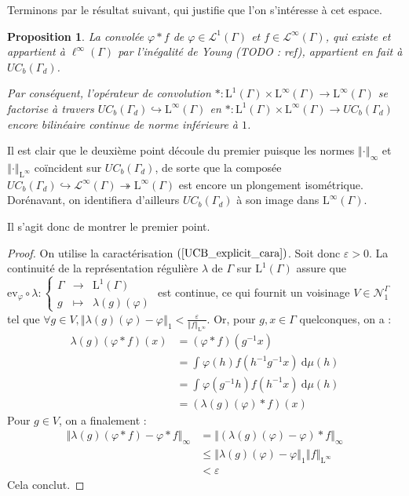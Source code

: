 \documentclass[a4paper,12pt]{article}
\newtheorem{proposition}[theorem]{Proposition}
\newcommand{\ev}{\mathrm{ev}}
\newcommand{\norm}[1]{\left\Vert #1\right\Vert}
\newcommand{\integral}[4]{\int_{#1}^{#2} #3~\mathrm{d}#4}
\newcommand\fundef[3]{#1: \left\{\begin{array}{ccc}#2\\#3\end{array}\right.}
\newcommand{\inv}{^{-1}}
\newcommand{\comp}{\circ}
\newcommand{\nhds}{\mathcal{N}}
\newcommand{\TODO}[1]{{\color{red}TODO :} #1}
\begin{document}
Terminons par le résultat suivant, qui justifie que l'on s'intéresse à cet espace.

\begin{proposition}\label{conv_UCB}
    La convolée $\varphi\ast f$ de $\varphi\in\mathscr{L}^1(\Gamma)$ et $f\in\mathscr{L}^\infty(\Gamma)$, qui existe et appartient à $\ell^\infty(\Gamma)$ par l'inégalité de Young (\TODO{ref}),
    appartient en fait à $UC_b(\Gamma_d)$.

    Par conséquent, l'opérateur de convolution $\ast:\mathrm{L}^1(\Gamma)\times\mathrm{L}^\infty(\Gamma)\to\mathrm{L}^\infty(\Gamma)$
    se factorise à travers $UC_b(\Gamma_d)\hookrightarrow\mathrm{L}^\infty(\Gamma)$ en 
    $\ast:\mathrm{L}^1(\Gamma)\times\mathrm{L}^\infty(\Gamma)\to UC_b(\Gamma_d)$ encore bilinéaire continue de norme inférieure à $1$.
\end{proposition}

Il est clair que le deuxième point découle du premier puisque les normes $\norm{\cdot}_\infty$ et $\norm{\cdot}_{\mathrm{L}^\infty}$ coïncident 
sur $UC_b(\Gamma_d)$, de sorte que la composée $UC_b(\Gamma_d)\hookrightarrow\mathscr{L}^\infty(\Gamma)\twoheadrightarrow\mathrm{L}^\infty(\Gamma)$
est encore un plongement isométrique. Dorénavant, on identifiera d'ailleurs $UC_b(\Gamma_d)$ à son image dans $\mathrm{L}^\infty(\Gamma)$.

Il s'agit donc de montrer le premier point.

\begin{proof}
    On utilise la caractérisation $(\ref{UCB_explicit_cara})$. Soit donc $\varepsilon>0$. La continuité de la représentation régulière $\lambda$ de $\Gamma$ sur $\mathrm{L}^1(\Gamma)$ %
    assure que 
    $\fundef{\ev_\varphi\comp\lambda}{\Gamma&\to&\mathrm{L}^1(\Gamma)}{g&\mapsto&\lambda(g)(\varphi)}$ est continue, ce qui fournit 
    un voisinage $V\in\nhds_1^\Gamma$ tel que $\forall g\in V, \norm{\lambda(g)(\varphi) - \varphi}_1<\frac{\varepsilon}{\norm{f}_{\mathrm{L}^\infty}}$. Or, pour $g, x\in \Gamma$ quelconques, on a :
    \begin{align*}
        \lambda(g)(\varphi\ast f)(x)
            &= (\varphi\ast f)(g\inv x) \\
            &= \integral{}{}{\varphi(h)f(h\inv g\inv x)}{\mu(h)} \\
            &= \integral{}{}{\varphi(g\inv h)f(h\inv x)}{\mu(h)} \\
            &= (\lambda(g)(\varphi)\ast f)(x)
    \end{align*}
    Pour $g\in V$, on a finalement :
    \begin{align*}
        \norm{\lambda(g)(\varphi\ast f) - \varphi\ast f}_\infty 
            &= \norm{(\lambda(g)(\varphi) - \varphi)\ast f}_\infty \\
            &\le \norm{\lambda(g)(\varphi) - \varphi}_1\norm{f}_{\mathrm{L}^\infty} \\
            &< \varepsilon
    \end{align*}
    Cela conclut.
\end{proof}
\end{document}
